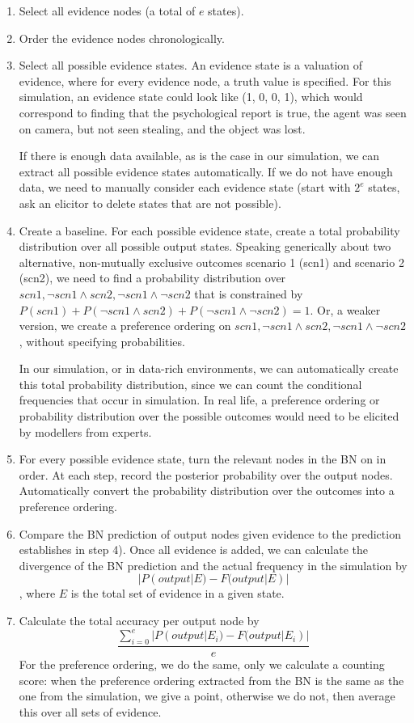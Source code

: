 \documentclass[12pt]{article}
\begin{document}
\begin{enumerate}
\item Select all evidence nodes (a total of $e$ states).
\item Order the evidence nodes chronologically.
\item Select all possible evidence states. An evidence state is a valuation of evidence, where for every evidence node, a truth value is specified. For this simulation, an evidence state could look like (1, 0, 0, 1), which would correspond to finding that the psychological report is true, the agent was seen on camera, but not seen stealing, and the object was lost.

If there is enough data available, as is the case in our simulation, we can extract all possible evidence states automatically. If we do not have enough data, we need to manually consider each evidence state (start with $2^e$ states, ask an elicitor to delete states that are not possible).
\item Create a baseline. For each possible evidence state, create a total probability distribution over all possible output states. Speaking generically about two alternative, non-mutually exclusive outcomes scenario 1 (scn1) and scenario 2 (scn2), we need to find a probability distribution over $scn1, \neg scn1 \land scn2, \neg scn1 \land \neg scn2$ that is constrained by $P(scn1) + P(\neg scn1 \land scn2) + P(\neg scn1 \land \neg scn2) = 1$. Or, a weaker version, we create a preference ordering on $scn1, \neg scn1 \land scn2, \neg scn1 \land \neg scn2$, without specifying probabilities. 

In our simulation, or in data-rich environments, we can automatically create this total probability distribution, since we can count the conditional frequencies that occur in simulation. In real life, a preference ordering or probability distribution over the possible outcomes would need to be elicited by modellers from experts.

\item For every possible evidence state, turn the relevant nodes in the BN on in order. At each step, record the posterior probability over the output nodes. Automatically convert the probability distribution over the outcomes into a preference ordering.
\item Compare the BN prediction of output nodes given evidence to the prediction establishes in step 4). Once all evidence is added, we can calculate the divergence of the BN prediction and the actual frequency in the simulation by \[|P(output|E) - F(output|E)|\], where $E$ is the total set of evidence in a given state.
\item Calculate the total accuracy per output node by \[\frac{\sum_{i=0}^{e}|P(output | E_i) - F(output| E_i)|}{e}\] For the preference ordering, we do the same, only we calculate a counting score: when the preference ordering extracted from the BN is the same as the one from the simulation, we give a point, otherwise we do not, then average this over all sets of evidence.
\end{enumerate}
\end{document}
